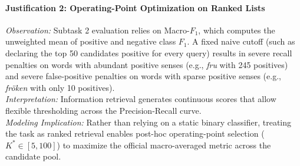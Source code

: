 \paragraph{Justification 2: Operating-Point Optimization on Ranked Lists}
\textit{Observation:} Subtask 2 evaluation relies on Macro-$F_1$, which computes the unweighted mean of positive and negative class $F_1$. A fixed naive cutoff (such as declaring the top 50 candidates positive for every query) results in severe recall penalties on words with abundant positive senses (e.g., \textit{fru} with 245 positives) and severe false-positive penalties on words with sparse positive senses (e.g., \textit{fr\"oken} with only 10 positives).\\
\textit{Interpretation:} Information retrieval generates continuous scores that allow flexible thresholding across the Precision-Recall curve.\\
\textit{Modeling Implication:} Rather than relying on a static binary classifier, treating the task as ranked retrieval enables post-hoc operating-point selection ($K^* \in [5, 100]$) to maximize the official macro-averaged metric across the candidate pool.


